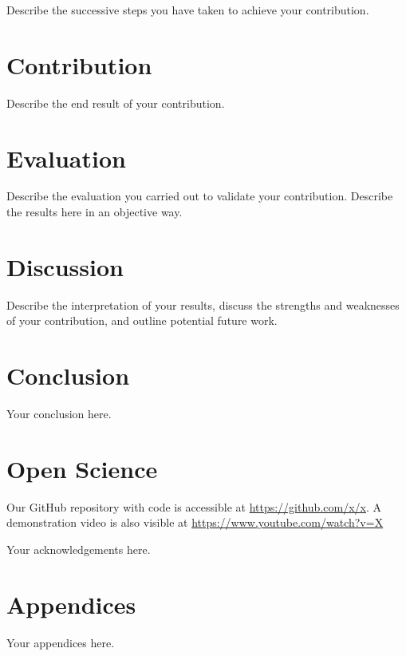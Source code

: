 \documentclass[sigconf]{acmart}
\begin{document}
Describe the successive steps you have taken to achieve your contribution. %


\section{Contribution}

Describe the end result of your contribution. %


\section{Evaluation}

Describe the evaluation you carried out to validate your contribution. Describe the results here in an objective way. %


\section{Discussion}

Describe the interpretation of your results, discuss the strengths and weaknesses of your contribution, and outline potential future work. %


\section{Conclusion}

Your conclusion here. %


\section*{Open Science}

Our GitHub repository with code is accessible at \url{https://github.com/x/x}. %
A demonstration video is also visible at \url{https://www.youtube.com/watch?v=X} %


\begin{acks}

Your acknowledgements here. %

\end{acks}

\section*{Appendices}

Your appendices here. %



\end{document}
